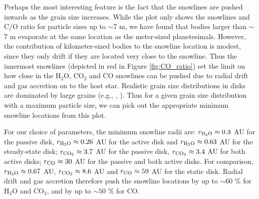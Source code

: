 \documentclass[apj]{emulateapj}
\begin{document}
Perhaps the most interesting feature is the fact that the snowlines are pushed inwards as the grain size increases. While the plot only shows the snowlines and C/O ratio for particle sizes up to $\sim$7 m, we have found that %
bodies larger than $\sim$7 m evaporate at the same location as the meter-sized planetesimals. However, the contribution of kilometer-sized bodies to the snowline location is modest, since they only drift if they are located very close to the snowline.
Thus the innermost snowlines (depicted in red in Figure \ref{fig:CO_ratio}) set the limit on how close in the H$_2$O, CO$_2$ and CO snowlines can be pushed due to radial drift and gas accretion on to the host star. Realistic grain size distributions in disks are dominated by large grains (e.g., \citealt{dalessio01}, \citealt{birnstiel12}).  Thus for a given grain size distribution with a maximum particle size, we can pick out the appropriate minimum snowline locations from this plot. %


For our choice of parameters, the minimum snowline radii are: $r_{\rm{H_2O}} \approx 0.3$ AU for the passive disk, $r_{\rm{H_2O}} \approx 0.26$ AU for the active disk and $r_{\rm{H_2O}} \approx 0.63$ AU for the steady-state disk; $r_{\rm{CO_2}} \approx 3.7$ AU for the passive disk, $r_{\rm{CO_2}} \approx 3.4$ AU for both active disks; $r_{\rm{CO}} \approx 30$ AU for the passive and both active disks. For comparison, $r_{\rm{H_2O}} \approx 0.67$ AU, $r_{\rm{CO_2}} \approx 8.6$ AU and $r_{\rm{CO}} \approx 59$ AU for the static disk. Radial drift and gas accretion therefore push the snowline locations by up to $\sim$$60$ \% for H$_2$O and CO$_2$, and by up to $\sim$$50$ \% for CO.  
\end{document}
